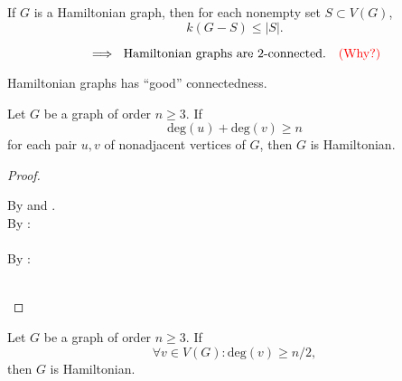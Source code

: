 
\begin{frame}{}
  \begin{theorem}
    If $G$ is a Hamiltonian graph, then for each nonempty set $S \subset V(G)$,
    \[
      k(G - S) \le \big\lvert S \big\rvert.
    \]
  \end{theorem}

  \pause
  \[
    \implies \text{ Hamiltonian graphs are } 2\text{-connected.} \quad \textcolor{red}{(\text{Why?})}
  \]

  \pause
  \vspace{0.30cm}
  \begin{center}
    Hamiltonian graphs has ``good'' connectedness. \\[10pt] \pause
  \end{center}
\end{frame}

\begin{frame}{}
  \begin{theorem}
    Let $G$ be a graph of order $n \ge 3$. If
    \[
      \text{deg}(u) + \text{deg}(v) \ge n
    \]
    for each pair $u,v$ of nonadjacent vertices of $G$,
    then $G$ is Hamiltonian.
  \end{theorem}

  \pause
  \begin{proof}
    \begin{center}
      By  and . \\[10pt] \pause
      By : \\ [5pt]
       \\[8pt] \pause
      By : \\[5pt]
       \\[8pt] \pause
    \end{center}

  \end{proof}
\end{frame}

\begin{frame}{}
  \begin{theorem}
    Let $G$ be a graph of order $n \ge 3$. If
    \[
      \forall v \in V(G): \text{deg}(v) \ge n/2,
    \]
    then $G$ is Hamiltonian.
  \end{theorem}
\end{frame}

